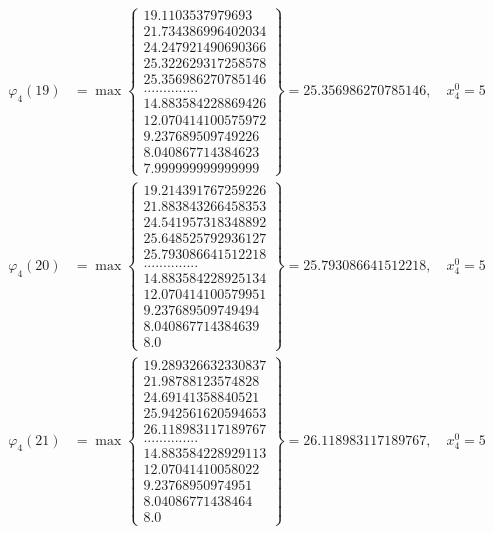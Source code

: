 \documentclass{article}
\begin{document}
\begin{align*}
  
  
  
\varphi_{4}(19) &= \max \left\{ \begin{array}{c}
19.1103537979693 \\
 21.734386996402034 \\
 24.247921490690366 \\
 25.322629317258578 \\
 25.356986270785146 \\
 .............. \\
 14.883584228869426 \\
 12.070414100575972 \\
 9.237689509749226 \\
 8.040867714384623 \\
 7.999999999999999
\end{array} \right\} = 25.356986270785146, \quad x_{4}^0 = 5\\
  
  
  
  
\varphi_{4}(20) &= \max \left\{ \begin{array}{c}
19.214391767259226 \\
 21.883843266458353 \\
 24.541957318348892 \\
 25.648525792936127 \\
 25.793086641512218 \\
 .............. \\
 14.883584228925134 \\
 12.070414100579951 \\
 9.237689509749494 \\
 8.040867714384639 \\
 8.0
\end{array} \right\} = 25.793086641512218, \quad x_{4}^0 = 5\\
  
  
  
  
\varphi_{4}(21) &= \max \left\{ \begin{array}{c}
19.289326632330837 \\
 21.98788123574828 \\
 24.69141358840521 \\
 25.942561620594653 \\
 26.118983117189767 \\
 .............. \\
 14.883584228929113 \\
 12.07041410058022 \\
 9.23768950974951 \\
 8.04086771438464 \\
 8.0
\end{array} \right\} = 26.118983117189767, \quad x_{4}^0 = 5\\
  

\end{align*}
\end{document}
